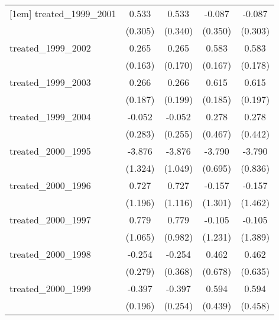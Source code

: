 {\begin{tabular}{l*{4}{c}}
[1em]
treated\_1999\_2001&       0.533         &       0.533         &      -0.087         &      -0.087         \\
            &     (0.305)         &     (0.340)         &     (0.350)         &     (0.303)         \\
[1em]
treated\_1999\_2002&       0.265         &       0.265         &       0.583\sym{***}&       0.583\sym{**} \\
            &     (0.163)         &     (0.170)         &     (0.167)         &     (0.178)         \\
[1em]
treated\_1999\_2003&       0.266         &       0.266         &       0.615\sym{***}&       0.615\sym{**} \\
            &     (0.187)         &     (0.199)         &     (0.185)         &     (0.197)         \\
[1em]
treated\_1999\_2004&      -0.052         &      -0.052         &       0.278         &       0.278         \\
            &     (0.283)         &     (0.255)         &     (0.467)         &     (0.442)         \\
[1em]
treated\_2000\_1995&      -3.876\sym{**} &      -3.876\sym{***}&      -3.790\sym{***}&      -3.790\sym{***}\\
            &     (1.324)         &     (1.049)         &     (0.695)         &     (0.836)         \\
[1em]
treated\_2000\_1996&       0.727         &       0.727         &      -0.157         &      -0.157         \\
            &     (1.196)         &     (1.116)         &     (1.301)         &     (1.462)         \\
[1em]
treated\_2000\_1997&       0.779         &       0.779         &      -0.105         &      -0.105         \\
            &     (1.065)         &     (0.982)         &     (1.231)         &     (1.389)         \\
[1em]
treated\_2000\_1998&      -0.254         &      -0.254         &       0.462         &       0.462         \\
            &     (0.279)         &     (0.368)         &     (0.678)         &     (0.635)         \\
[1em]
treated\_2000\_1999&      -0.397\sym{*}  &      -0.397         &       0.594         &       0.594         \\
            &     (0.196)         &     (0.254)         &     (0.439)         &     (0.458)         \\

\end{tabular}}
